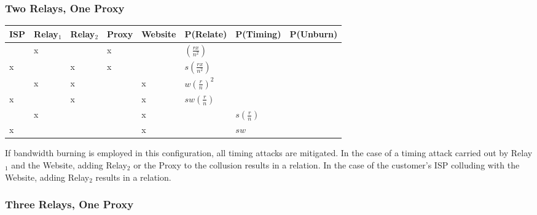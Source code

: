 \subsubsection*{Two Relays, One Proxy}


\begin{center}
\begin{tabular}{l | l | l | l | l | l | l | l}
  ISP & Relay$_1$ & Relay$_2$ & Proxy & Website & P(Relate)           & P(Timing) & P(Unburn) \\
  \hline
      & x         &           & x     &         & $(\frac{rx}{n^2})$  &           & \\
  \hline
  x   &           & x         & x     &         & $s(\frac{rx}{n^2})$ &           & \\
  \hline
      & x         & x         &       & x       & $w(\frac{r}{n})^2$  &           & \\
  \hline
  x   &           & x         &       & x       & $sw(\frac{r}{n})$   &           & \\
  \hline
      & x         &           &       & x       &                     & $s(\frac{r}{n})$ & \\
  \hline
  x   &           &           &       & x       &                     & $sw$      & \\
\end{tabular}
\end{center}

If bandwidth burning is employed in this configuration, all timing
attacks are mitigated. In the case of a timing attack carried out by
Relay$_1$ and the Website, adding Relay$_2$ or the Proxy to the
collusion results in a relation. In the case of the customer's ISP
colluding with the Website, adding Relay$_2$ results in a relation.

\subsubsection*{Three Relays, One Proxy}



